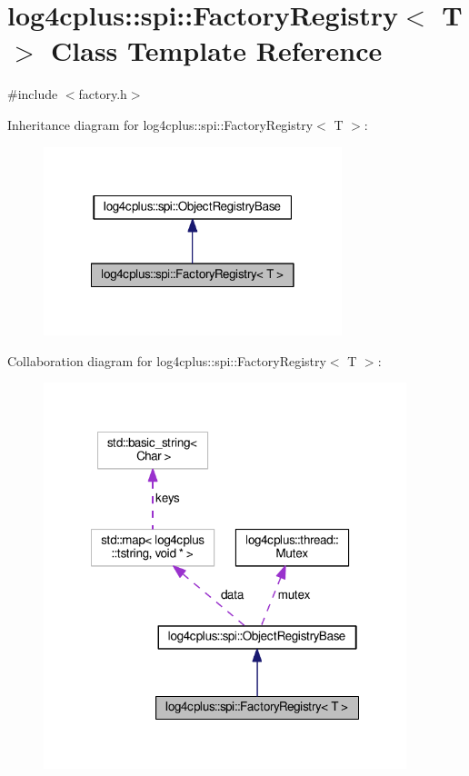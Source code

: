 \hypertarget{classlog4cplus_1_1spi_1_1FactoryRegistry}{\section{log4cplus\-:\-:spi\-:\-:Factory\-Registry$<$ T $>$ Class Template Reference}
\label{classlog4cplus_1_1spi_1_1FactoryRegistry}
}


{\ttfamily \#include $<$factory.\-h$>$}



Inheritance diagram for log4cplus\-:\-:spi\-:\-:Factory\-Registry$<$ T $>$\-:
\nopagebreak
\begin{figure}[H]
\begin{center}
\leavevmode
\includegraphics[width=246pt]{classlog4cplus_1_1spi_1_1FactoryRegistry__inherit__graph}
\end{center}
\end{figure}


Collaboration diagram for log4cplus\-:\-:spi\-:\-:Factory\-Registry$<$ T $>$\-:
\nopagebreak
\begin{figure}[H]
\begin{center}
\leavevmode
\includegraphics[width=299pt]{classlog4cplus_1_1spi_1_1FactoryRegistry__coll__graph}
\end{center}
\end{figure}
